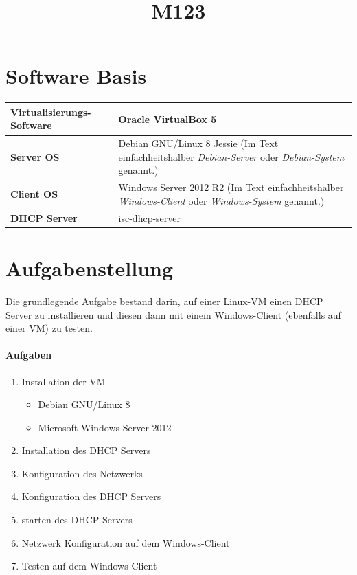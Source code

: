 \documentclass[12pt,a4paper,twoside,titlepage]{article}
\title{\textbf{M123}\\\titleText}
\author{\authorText}
\date{\dateText}
\begin{document}
	\maketitle
	\tableofcontents

        \section{Software Basis}

        \begin{tabular}{|l|p{7cm}|}
          \hline
          \textbf{Virtualisierungs-Software} & Oracle VirtualBox 5\\\hline
          \textbf{Server OS} & Debian GNU/Linux 8 Jessie (Im Text einfachheitshalber \textit{Debian-Server} oder \textit{Debian-System} genannt.)\\\hline
          \textbf{Client OS} & Windows Server 2012 R2 (Im Text einfachheitshalber \textit{Windows-Client} oder \textit{Windows-System} genannt.) \\\hline
          \textbf{DHCP Server} & isc-dhcp-server \\\hline
        \end{tabular}

        \section{Aufgabenstellung}

        Die grundlegende Aufgabe bestand darin, auf einer Linux-VM einen DHCP Server zu installieren und diesen dann mit einem Windows-Client (ebenfalls auf einer VM) zu testen.

        \paragraph{Aufgaben}
        \begin{enumerate}
        \item Installation der VM
          \begin{itemize}
          \item Debian GNU/Linux 8
          \item Microsoft Windows Server 2012
          \end{itemize}
        \item Installation des DHCP Servers
        \item Konfiguration des Netzwerks
        \item Konfiguration des DHCP Servers
        \item starten des DHCP Servers
        \item Netzwerk Konfiguration auf dem Windows-Client
        \item Testen auf dem Windows-Client
        \end{enumerate}
\end{document}
